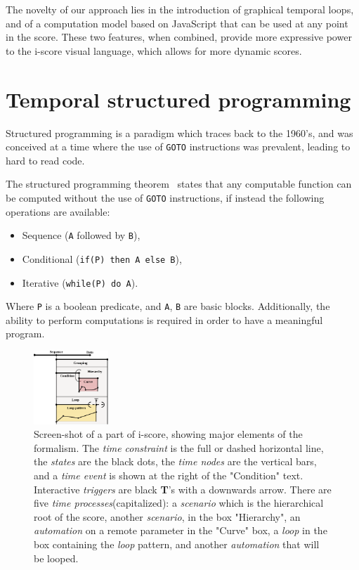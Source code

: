 \documentclass{article}
\newcommand{\scenario}{\textit{scenario}\xspace}
\newcommand{\Loop}{\textit{loop}\xspace}
\newcommand{\states}{\textit{states}\xspace}
\newcommand{\timeevent}{\textit{time event}\xspace}
\newcommand{\timenodes}{\textit{time nodes}\xspace}
\newcommand{\timeconstraint}{\textit{time constraint}\xspace}
\newcommand{\timeprocesses}{\textit{time processes}\xspace}
\newcommand{\automation}{\textit{automation}\xspace}
\newcommand{\triggers}{\textit{triggers}\xspace}
\begin{document}
The novelty of our approach lies in the introduction of graphical temporal loops, and of a computation model 
based on JavaScript that can be used at any point in the score. 
These two features, when combined, provide more expressive power to the i-score visual language, 
which allows for more dynamic scores.

\section{Temporal structured programming}
Structured programming is a paradigm which traces 
back to the 1960's, and was conceived at a time where the use of \lstinline{GOTO}
instructions was prevalent, leading to hard to read code.

The structured programming theorem~\cite{bohm1966flow,mills1972mathematical} states that any computable function can be computed 
without the use of \lstinline{GOTO} instructions, if instead the following operations are available: 
\begin{itemize}
    \item Sequence (\lstinline{A} followed by \lstinline{B}), 
    \item Conditional (\lstinline{if(P) then A else B}), 
    \item Iterative (\lstinline{while(P) do A}).
\end{itemize}

Where \lstinline|P| is a boolean predicate, and \lstinline|A|, \lstinline|B| are basic blocks.
Additionally, the ability to perform computations is required in order to have a meaningful program.

\begin{figure}
    \centering
    \includegraphics[width=0.25\textwidth]{images/hierarchy.eps}
    \caption{Screen-shot of a part of i-score, showing major elements of the formalism. The \timeconstraint is the full or dashed horizontal line, the \states are the black dots, the \timenodes are the vertical bars, and a \timeevent is shown at the right of the "Condition" text. Interactive \triggers are black \textbf{T}'s with a downwards arrow. There are five \timeprocesses (capitalized): a \scenario which is the hierarchical root of the score, another \scenario, in the box "Hierarchy", an \automation on a remote parameter in the "Curve" box, a \Loop in the box containing the \Loop pattern, and another \automation that will be looped.}
    \label{fig.hierarchy}
\end{figure}
\end{document}
